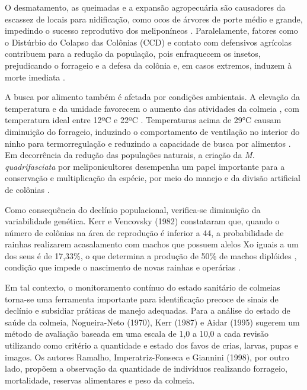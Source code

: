 \documentclass[12pt]{unisenaiclass}
\begin{document}
O desmatamento, as queimadas e a expansão agropecuária são causadores da escassez de locais para nidificação, como ocos de árvores de porte médio e grande, impedindo o sucesso reprodutivo dos meliponíneos \cite{rodriguesocos1964}. Paralelamente, fatores como o Distúrbio do Colapso das Colônias (CCD) e contato com defensivos agrícolas contribuem para a redução da população, pois enfraquecem os insetos, prejudicando o forrageio e a defesa da colônia e, em casos extremos, induzem à morte imediata \cite{tomemushroom2012,silvaagrotoxicos2014}. 

A busca por alimento também é afetada por condições ambientais. A elevação da temperatura e da umidade favorecem o aumento das atividades da colmeia \cite{barbosa2023}, com temperatura ideal entre 12ºC e 22ºC \cite{maiasilva2014}. Temperaturas acima de 29°C causam diminuição do forrageio, induzindo o comportamento de ventilação no interior do ninho para termorregulação e reduzindo a capacidade de busca por alimentos \cite{hikawapollination2009}. Em decorrência da redução das populações naturais, a criação da \textit{M. quadrifasciata} por meliponicultores desempenha um papel importante para a conservação e multiplicação da espécie, por meio do manejo e da divisão artificial de colônias \cite{aidarartificial1998}.

Como consequência do declínio populacional, verifica-se diminuição da variabilidade genética. Kerr e Vencovsky (1982) constataram que, quando o número de colônias na área de reprodução é inferior a 44, a probabilidade de rainhas realizarem acasalamento com machos que possuem alelos Xo iguais a um dos seus é de 17,33\%, o que determina a produção de 50\% de machos diplóides \cite{mackensengenetica1951,kerrgenetica1987}, condição que impede o nascimento de novas rainhas e operárias \cite{camargoreproducao1976}.

Em tal contexto, o monitoramento contínuo do estado sanitário de colmeias torna-se uma ferramenta importante para identificação precoce de sinais de declínio e subsidiar práticas de manejo adequadas. Para a análise do estado de saúde da colmeia, Nogueira-Neto (1970), Kerr (1987) e Aidar (1995) sugerem um método de avaliação baseada em uma escala de 1,0 a 10,0 a cada revisão utilizando como critério a quantidade e estado dos favos de crias, larvas, pupas e imagos. Os autores Ramalho, Imperatriz-Fonseca e Giannini (1998), por outro lado, propõem a observação da quantidade de indivíduos realizando forrageio, mortalidade, reservas alimentares e peso da colmeia.
\end{document}
